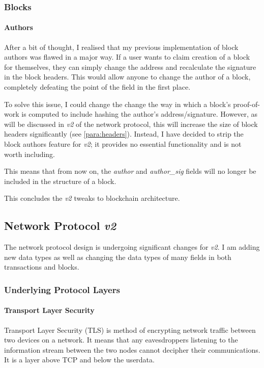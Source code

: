 \documentclass{article}
\begin{document}
\subsubsection{Blocks}
\paragraph{Authors} \label{para:block_authors}
After a bit of thought, I realised that my previous implementation of block authors was flawed in a major way. If a user wants to claim creation of a block for themselves, they can simply change the address and recalculate the signature in the block headers. This would allow anyone to change the author of a block, completely defeating the point of the field in the first place.

To solve this issue, I could change the change the way in which a block's proof-of-work is computed to include hashing the author's address/signature. However, as will be discussed in \textit{v2} of the network protocol, this will increase the size of block headers significantly (see \autoref{para:headers}). Instead, I have decided to strip the block authors feature for \textit{v2}; it provides no essential functionality and is not worth including.

This means that from now on, the \textit{author} and \textit{author\_sig} fields will no longer be included in the structure of a block.

\vspace{1cm}
This concludes the \textit{v2} tweaks to blockchain architecture.

\newpage

\subsection{Network Protocol \textit{v2}}
The network protocol design is undergoing significant changes for \textit{v2}. I am adding new data types as well as changing the data types of many fields in both transactions and blocks.

\subsubsection{Underlying Protocol Layers}

\paragraph{Transport Layer Security}
Transport Layer Security (TLS) is method of encrypting network traffic between two devices on a network. It means that any eavesdroppers listening to the information stream between the two nodes cannot decipher their communications. It is a layer above TCP and below the userdata.
\end{document}
